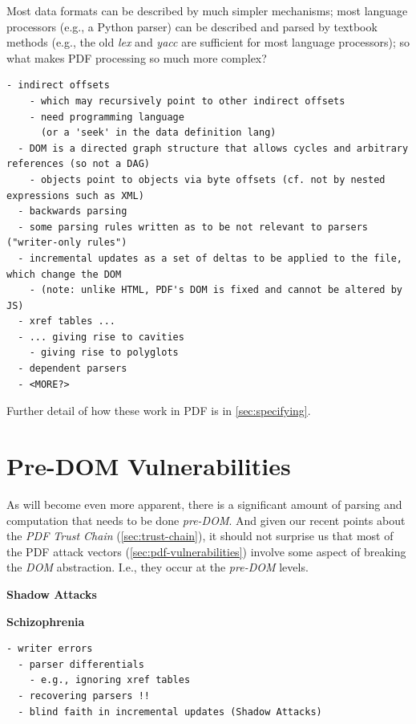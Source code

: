Most data formats can be described by much simpler mechanisms;
most language processors (e.g., a Python parser) can be described and parsed by
textbook methods (e.g., the old \emph{lex} and \emph{yacc} are sufficient for
most language processors);
so what makes PDF processing so much more complex?
\begin{lstlisting}[style=meta]
  - indirect offsets
    - which may recursively point to other indirect offsets
    - need programming language
      (or a 'seek' in the data definition lang)
  - DOM is a directed graph structure that allows cycles and arbitrary references (so not a DAG)
    - objects point to objects via byte offsets (cf. not by nested expressions such as XML)  
  - backwards parsing
  - some parsing rules written as to be not relevant to parsers ("writer-only rules")
  - incremental updates as a set of deltas to be applied to the file, which change the DOM
    - (note: unlike HTML, PDF's DOM is fixed and cannot be altered by JS)
  - xref tables ...
  - ... giving rise to cavities
    - giving rise to polyglots
  - dependent parsers
  - <MORE?>
\end{lstlisting}

Further detail of how these work in PDF is in \cref{sec:specifying}.

\section{Pre-DOM Vulnerabilities }
\label{sec:predom-vulnerabilities}

As will become even more apparent, there is a significant amount of
parsing and computation that needs to be done \emph{pre-DOM}.
And given our recent points about the \emph{PDF Trust Chain}
(\cref{sec:trust-chain}),
it should not surprise us that most of the PDF attack vectors
(\cref{sec:pdf-vulnerabilities})
involve some aspect of breaking the \emph{DOM} abstraction.
I.e., they occur at the \emph{pre-DOM} levels.

{\bf{Shadow Attacks}} 

{\bf{Schizophrenia}} 
\begin{lstlisting}[style=meta]
  - writer errors
  - parser differentials
    - e.g., ignoring xref tables
  - recovering parsers !!
  - blind faith in incremental updates (Shadow Attacks)
\end{lstlisting}


